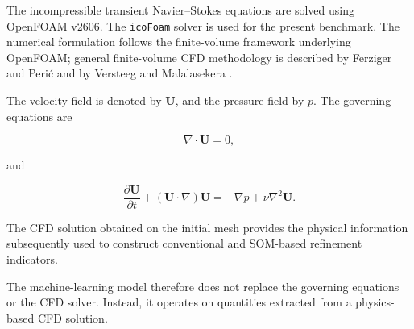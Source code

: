 The incompressible transient Navier--Stokes equations are solved using
OpenFOAM v2606. The \texttt{icoFoam} solver is used for the present benchmark.
The numerical formulation follows the finite-volume framework underlying
OpenFOAM; general finite-volume CFD methodology is described by Ferziger and
Peri\'c and by Versteeg and Malalasekera
\cite{weller1998,ferziger2002,versteeg2007,openfoam2606}.

The velocity field is denoted by \(\mathbf{U}\), and the pressure field by
\(p\). The governing equations are

\begin{equation}
\nabla\cdot\mathbf{U}=0,
\end{equation}

and

\begin{equation}
\frac{\partial\mathbf{U}}{\partial t}
+
(\mathbf{U}\cdot\nabla)\mathbf{U}
=
-\nabla p
+
\nu\nabla^2\mathbf{U}.
\end{equation}

The CFD solution obtained on the initial mesh provides the physical
information subsequently used to construct conventional and SOM-based
refinement indicators.

The machine-learning model therefore does not replace the governing
equations or the CFD solver. Instead, it operates on quantities extracted
from a physics-based CFD solution.
